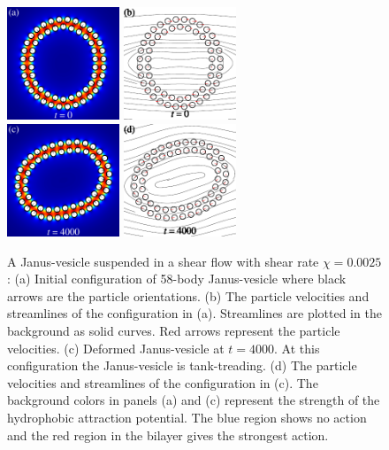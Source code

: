 \documentclass[lineno]{jfm}
\begin{document}
\begin{figure}
\centering
\includegraphics[width=0.3\textwidth]{N58_0.pdf}
\includegraphics[width=0.3\textwidth]{N58_vel_0.pdf}\\
\includegraphics[width=0.3\textwidth]{N58_20000.pdf}
\includegraphics[width=0.3\textwidth]{N58_vel_20000.pdf}
  \caption{\label{figure3} A Janus-vesicle suspended in a shear flow
  with shear rate $\chi=0.0025$: (a) Initial configuration of 58-body
  Janus-vesicle where black arrows are the particle orientations. (b)
  The particle velocities and streamlines of the configuration in (a).
  Streamlines are plotted in the background as solid curves. Red arrows
  represent the particle velocities. (c) Deformed Janus-vesicle at
  $t=4000$. At this configuration the Janus-vesicle is tank-treading.
  (d) The particle velocities and streamlines of the configuration in
  (c). The background colors in panels (a) and (c) represent the
  strength of the hydrophobic attraction potential. The blue region
  shows no action and the red region in the bilayer gives the strongest
  action.}
\end{figure}
%
%
\end{document}
